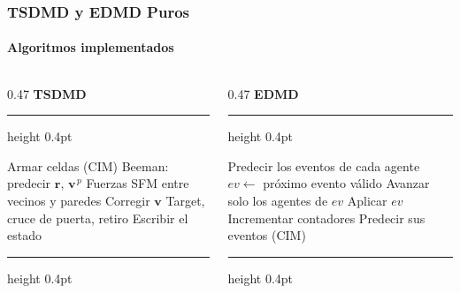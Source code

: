 \documentclass[11pt,aspectratio=169]{beamer}
\newcommand{\vect}[1]{\mathbf{#1}}          %
\newcommand{\dt}{\Delta t}
\begin{document}
\begin{frame}
  \frametitle{TSDMD y EDMD Puros}
  \framesubtitle{Algoritmos implementados}

  \vfill
  \begin{columns}[t]
    \begin{column}{0.47\textwidth}
      \centering
      \textbf{TSDMD}\par\vspace{0.3em}
      \hrule height 0.4pt\vspace{3pt}
      {\scriptsize
      \begin{algorithmic}[1]
          \State Armar celdas (CIM)
          \State Beeman: predecir $\vect{r}$, $\vect{v}^{\,p}$
          \State Fuerzas SFM entre vecinos y paredes
          \State Corregir $\vect{v}$
          \State Target, cruce de puerta, retiro
           \Comment{$\dt_2=k\,\dt$}
            \State Escribir el estado
          \EndIf
        \EndWhile
      \end{algorithmic}}
      \vspace{3pt}\hrule height 0.4pt
    \end{column}
    \begin{column}{0.47\textwidth}
      \centering
      \textbf{EDMD}\par\vspace{0.3em}
      \hrule height 0.4pt\vspace{3pt}
      {\scriptsize
      \begin{algorithmic}[1]
        \State Predecir los eventos de cada agente
          \State $ev\gets$ próximo evento válido
          \State Avanzar solo los agentes de $ev$
          \State Aplicar $ev$
          \State Incrementar contadores 
          \State Predecir sus eventos (CIM)
        \EndWhile
      \end{algorithmic}}
      \vspace{3pt}\hrule height 0.4pt
    \end{column}
  \end{columns}
  \vfill
\end{frame}
\end{document}
